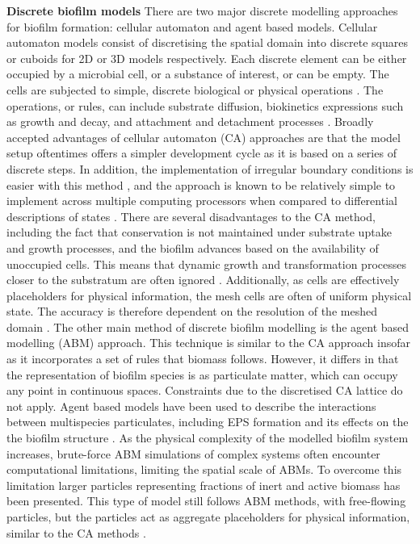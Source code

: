 \textbf{Discrete biofilm models}
There are two major discrete modelling approaches for biofilm formation: cellular automaton and agent based models. Cellular automaton models consist of discretising the spatial domain into discrete squares or cuboids for 2D or 3D models respectively. Each discrete element can be either occupied by a microbial cell, or a substance of interest, or can be empty. The cells are subjected to simple, discrete biological or physical operations \cite{dacunto2017}. The operations, or rules, can include substrate diffusion, biokinetics expressions such as growth and decay, and attachment and detachment processes \cite{skoneczny2015}. Broadly accepted advantages of cellular automaton (CA) approaches are that the model setup oftentimes offers a simpler  development cycle as it is based on a series of discrete steps. In addition, the implementation of irregular boundary conditions is easier with this method \cite{pizzaro2001}, and the approach is known to be relatively simple to implement across multiple computing processors when compared to differential descriptions of states \cite{toffoli1987} . There are several disadvantages to the CA method, including the fact that conservation is not maintained under substrate uptake and growth processes, and the biofilm advances based on the availability of unoccupied cells. This means that dynamic growth and transformation processes closer to the substratum are often ignored \cite{dacunto2017}. Additionally, as cells are effectively placeholders for physical information, the mesh cells are often of uniform physical state. The accuracy is therefore dependent on the resolution of the meshed domain \cite{dacunto2017}.
\skippingparagraph
The other main method of discrete biofilm modelling is the agent based modelling (ABM) approach. This technique is similar to the CA approach insofar as it incorporates a set of rules that biomass follows. However, it differs in that the representation of biofilm species is as particulate matter, which can occupy any point in continuous spaces. Constraints due to the discretised CA lattice do not apply. Agent based models have been used to describe the interactions between multispecies particulates, including EPS formation and its effects on the the biofilm structure \cite{xavier2005a}. As the physical complexity of the modelled biofilm system increases, brute-force ABM simulations of complex systems often encounter computational limitations, limiting the spatial scale of ABMs. To overcome this limitation larger particles representing fractions of inert and active biomass has been presented. This type of model still follows ABM methods, with free-flowing particles, but the particles act as aggregate placeholders for physical information, similar to the CA methods \cite{picioreanu2004}.

